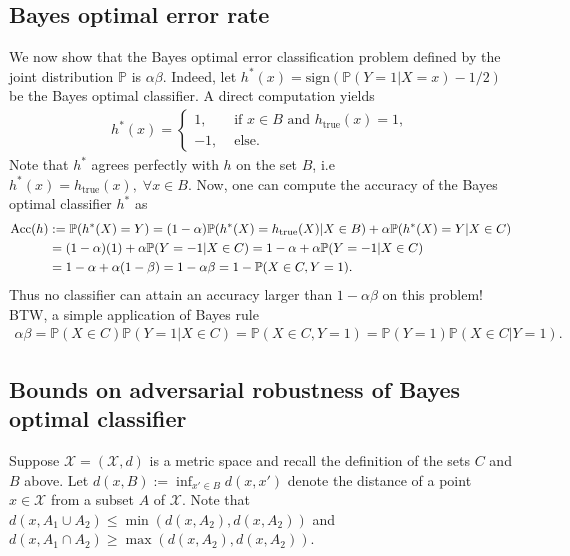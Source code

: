\subsection{Bayes optimal error rate}
We now show that the Bayes optimal
error classification problem defined by the joint distribution $\mathbb P$ is
$\alpha\beta$. Indeed, let $h^*(x) = \text{sign}(\mathbb{P}(Y=1|X=x)- 1/2)$ be
the Bayes optimal classifier. A direct computation yields
\begin{eqnarray}
  \label{eq:bayesh}
h^*(x) = \begin{cases}1,&\mbox{ if }x \in B\text{ and
  }h_{\text{true}}(x)=1,\\-1,&\mbox{ else.}\end{cases}
\end{eqnarray}
Note that $h^*$ agrees perfectly with $h$ on the set $B$, i.e
$h^*(x)=h_{\text{true}}(x),\;\forall x \in B$. Now, one can compute the
accuracy of the Bayes optimal classifier $h^*$ as
\begin{eqnarray*}
  \begin{split}
    \operatorname{Acc}(h)&:=\mathbb{P}(h^*(X)=Y)=(1-\alpha)
    \mathbb{P}(h^*(X)=h_{\text{true}}(X)|X \in B) + \alpha \mathbb{P}(h^*(X)=Y|X
    \in C)\\
    &=(1-\alpha)(1) + \alpha \mathbb{P}(Y=-1|X \in C)=1-\alpha + \alpha
    \mathbb{P}(Y=-1|X\in C)\\
    &=1-\alpha + \alpha(1-\beta)= 1 - \alpha\beta=1-\mathbb P(X \in C,Y=1).
  \end{split}
\end{eqnarray*}
Thus no classifier can attain an accuracy larger than $1-\alpha\beta$ on this
problem! BTW, a simple application of Bayes rule
\begin{eqnarray}
  \alpha\beta=\mathbb P(X \in C)\mathbb P(Y=1|X\in C)
  =\mathbb P(X \in C,Y=1)
  =\mathbb P(Y=1) \mathbb P(X \in C|Y=1).
\end{eqnarray}

\subsection{Bounds on adversarial robustness of Bayes optimal classifier}
Suppose $\mathcal X=(\mathcal X,d)$ is a  metric space and recall the
definition of the sets $C$ and $B$ above. Let $d(x,B):=\inf_{x' \in B}d(x,x')$
denote the distance of a point $x \in \mathcal X$ from a subset $A$ of
$\mathcal X$.
Note that $d(x,A_1 \cup A_2) \le \min(d(x,A_2),d(x,A_2))$ and $d(x,A_1 \cap A_2)
\ge \max(d(x,A_2),d(x,A_2))$.

